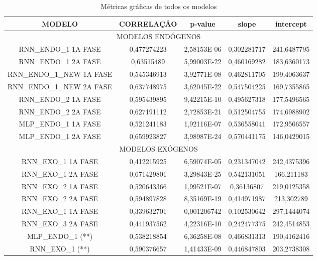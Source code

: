 \documentclass[	12pt, Times, openright, twoside, a4paper, english, brazil]{abntex2}
\begin{document}
\begin{table}[!ht]
        \caption{Métricas gráficas de todos os modelos}
        \begin{adjustbox}{width=\columnwidth,center}
           \begin{tabular}{ | c | c| c | c| c |}
     \rowcolor{gray!50}
   {	MODELO} & CORRELAÇÂO &	p-value &	slope & 	intercept\\ \hline
     \multicolumn{5}{c}{	MODELOS ENDÓGENOS }  \\ \hline
RNN\_ENDO\_1 1A FASE &	0,477274223	&2,58153E-06&	0,302281717&241,6487795 \\ \hline
RNN\_ENDO\_1 2A FASE&	0,63515489&	5,99003E-22&	0,460169282&	183,6360173\\ \hline
RNN\_ENDO\_1\_NEW 1A FASE&	0,545346913	&3,92771E-08&	0,462811705&	199,4063637\\ \hline
RNN\_ENDO\_1\_NEW 2A FASE&	0,637748975&	3,62045E-22	&0,547504225&	169,7355865\\ \hline
RNN\_ENDO\_2 1A FASE&	0,595439895&	9,42215E-10	&0,495627318&	177,5496565\\ \hline
RNN\_ENDO\_2 2A FASE&	0,627191112&2,72853E-21&	0,512504755	&174,6988902\\ \hline
MLP\_ENDO\_1 1A FASE&	0,521241183	&1,92116E-07&	0,536558041	&172,9566557\\ \hline
MLP\_ENDO\_1 2A FASE&	0,659923827	&3,98987E-24&	0,570441175&	146,0429015\\ \hline
	\multicolumn{5}{c}{ MODELOS EXÓGENOS }\\ \hline
RNN\_EXO\_1 1A FASE &	0,412215925&	6,59074E-05&	0,231347042&	242,4375396 \\ \hline
RNN\_EXO\_1 2A FASE &	0,671429801	&3,29843E-25&	0,542131051&	166,211183 \\ \hline
RNN\_EXO\_2 1A FASE&	0,520643366	&1,99521E-07&	0,36136807&	219,0125358 \\ \hline
RNN\_EXO\_2 2A FASE&	0,594897828&8,35169E-19&	0,414971987&	213,302789 \\ \hline
RNN\_EXO\_1 1A FASE&	0,339632701&	0,001206742	&0,102530642&	297,1444074 \\ \hline
RNN\_EXO\_3 2A FASE&	0,441937562&	4,22316E-10&	0,242477375	&242,4514853 \\ \hline
MLP\_ENDO\_1 (**)&	0,538218854	&6,36258E-08&	0,466831313&190,4162416 \\ \hline
RNN\_EXO\_1  (**)&	0,590376657	&1,41433E-09&	0,446847803	&203,2738308 \\ \hline
\end{tabular} \end{adjustbox} \end{table} 
\end{document}
